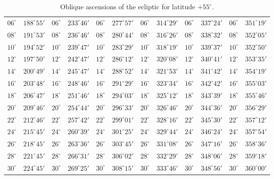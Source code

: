 \begin{table}[!h]
{\begin{tabular}{cc|cc|cc|cc|cc|cc}
$06^\circ$ & $188^\circ55'$ & $06^\circ$ & $233^\circ46'$ & $06^\circ$ & $277^\circ57'$ & $06^\circ$ & $314^\circ29'$ &  $06^\circ$ & $337^\circ24'$ & $06^\circ$ & $351^\circ19'$\\
$08^\circ$ & $191^\circ53'$ & $08^\circ$ & $236^\circ46'$ & $08^\circ$ & $280^\circ44'$ & $08^\circ$ & $316^\circ26'$ &  $08^\circ$ & $338^\circ32'$ & $08^\circ$ & $352^\circ05'$\\
$10^\circ$ & $194^\circ52'$ & $10^\circ$ & $239^\circ47'$ & $10^\circ$ & $283^\circ29'$ & $10^\circ$ & $318^\circ19'$ &  $10^\circ$ & $339^\circ37'$ & $10^\circ$ & $352^\circ50'$\\
$12^\circ$ & $197^\circ50'$ & $12^\circ$ & $242^\circ47'$ & $12^\circ$ & $286^\circ12'$ & $12^\circ$ & $320^\circ08'$ &  $12^\circ$ & $340^\circ41'$ & $12^\circ$ & $353^\circ35'$\\
$14^\circ$ & $200^\circ49'$ & $14^\circ$ & $245^\circ47'$ & $14^\circ$ & $288^\circ52'$ & $14^\circ$ & $321^\circ53'$ &  $14^\circ$ & $341^\circ42'$ & $14^\circ$ & $354^\circ19'$\\
$16^\circ$ & $203^\circ48'$ & $16^\circ$ & $248^\circ46'$ & $16^\circ$ & $291^\circ29'$ & $16^\circ$ & $323^\circ34'$ &  $16^\circ$ & $342^\circ42'$ & $16^\circ$ & $355^\circ03'$\\
$18^\circ$ & $206^\circ47'$ & $18^\circ$ & $251^\circ46'$ & $18^\circ$ & $294^\circ03'$ & $18^\circ$ & $325^\circ12'$ &  $18^\circ$ & $343^\circ39'$ & $18^\circ$ & $355^\circ46'$\\
$20^\circ$ & $209^\circ46'$ & $20^\circ$ & $254^\circ44'$ & $20^\circ$ & $296^\circ33'$ & $20^\circ$ & $326^\circ46'$ &  $20^\circ$ & $344^\circ36'$ & $20^\circ$ & $356^\circ29'$\\
$22^\circ$ & $212^\circ46'$ & $22^\circ$ & $257^\circ42'$ & $22^\circ$ & $299^\circ01'$ & $22^\circ$ & $328^\circ16'$ &  $22^\circ$ & $345^\circ30'$ & $22^\circ$ & $357^\circ12'$\\
$24^\circ$ & $215^\circ45'$ & $24^\circ$ & $260^\circ39'$ & $24^\circ$ & $301^\circ25'$ & $24^\circ$ & $329^\circ44'$ &  $24^\circ$ & $346^\circ24'$ & $24^\circ$ & $357^\circ54'$\\
$26^\circ$ & $218^\circ45'$ & $26^\circ$ & $263^\circ36'$ & $26^\circ$ & $303^\circ45'$ & $26^\circ$ & $331^\circ08'$ &  $26^\circ$ & $347^\circ16'$ & $26^\circ$ & $358^\circ36'$\\
$28^\circ$ & $221^\circ45'$ & $28^\circ$ & $266^\circ31'$ & $28^\circ$ & $306^\circ02'$ & $28^\circ$ & $332^\circ29'$ &  $28^\circ$ & $348^\circ06'$ & $28^\circ$ & $359^\circ18'$\\
$30^\circ$ & $224^\circ45'$ & $30^\circ$ & $269^\circ25'$ & $30^\circ$ & $308^\circ15'$ & $30^\circ$ & $333^\circ46'$ &  $30^\circ$ & $348^\circ56'$ & $30^\circ$ & $360^\circ00'$\\
\end{tabular}}
\caption{Oblique ascensions of the ecliptic  for latitude $+55^\circ$.}\label{tzz}
\end{table}

